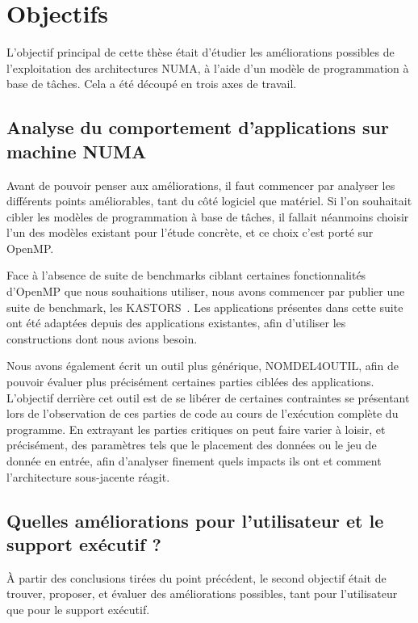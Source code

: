\section{Objectifs}\label{sec:intro:objectives}

L'objectif principal de cette thèse était d'étudier les améliorations possibles de l'exploitation des architectures NUMA, à l'aide d'un modèle de programmation à base de tâches.
Cela a été découpé en trois axes de travail.


\subsection*{Analyse du comportement d'applications sur machine NUMA}

Avant de pouvoir penser aux améliorations, il faut commencer par analyser les différents points améliorables, tant du côté logiciel que matériel.
Si l'on souhaitait cibler les modèles de programmation à base de tâches, il fallait néanmoins choisir l'un des modèles existant pour l'étude concrète, et ce choix c'est porté sur OpenMP.

Face à l'absence de suite de benchmarks ciblant certaines fonctionnalités d'OpenMP que nous souhaitions utiliser, nous avons commencer par publier une suite de benchmark, les KASTORS~\cite{Virouleau2014}.
Les applications présentes dans cette suite ont été adaptées depuis des applications existantes, afin d'utiliser les constructions dont nous avions besoin.

Nous avons également écrit un outil plus générique, NOMDEL4OUTIL, afin de pouvoir évaluer plus précisément certaines parties ciblées des applications.
L'objectif derrière cet outil est de se libérer de certaines contraintes se présentant lors de l'observation de ces parties de code au cours de l'exécution complète du programme.
En extrayant les parties critiques on peut faire varier à loisir, et précisément, des paramètres tels que le placement des données ou le jeu de donnée en entrée, afin d'analyser finement quels impacts ils ont et comment l'architecture sous-jacente réagit.


\subsection*{Quelles améliorations pour l'utilisateur et le support exécutif ?}

À partir des conclusions tirées du point précédent, le second objectif était de trouver, proposer, et évaluer des améliorations possibles, tant pour l'utilisateur que pour le support exécutif.

